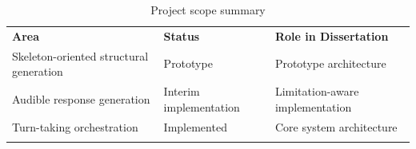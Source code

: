 \begin{longtable}[]{@{}
  >{\raggedright\arraybackslash}p{}
  >{\raggedright\arraybackslash}p{}
  >{\raggedright\arraybackslash}p{}@{}}
\caption{Project scope summary}\label{tab:scope-summary}\\
\toprule\noalign{}
\begin{minipage}[b]{\linewidth}\raggedright
\textbf{Area}
\end{minipage} & \begin{minipage}[b]{\linewidth}\raggedright
\textbf{Status}
\end{minipage} & \begin{minipage}[b]{\linewidth}\raggedright
\textbf{Role in Dissertation}
\end{minipage} \\
\begin{minipage}[b]{\linewidth}\raggedright
Skeleton-oriented structural generation
\end{minipage} & \begin{minipage}[b]{\linewidth}\raggedright
Prototype
\end{minipage} & \begin{minipage}[b]{\linewidth}\raggedright
Prototype architecture
\end{minipage} \\
\begin{minipage}[b]{\linewidth}\raggedright
Audible response generation
\end{minipage} & \begin{minipage}[b]{\linewidth}\raggedright
Interim implementation
\end{minipage} & \begin{minipage}[b]{\linewidth}\raggedright
Limitation-aware implementation
\end{minipage} \\
\begin{minipage}[b]{\linewidth}\raggedright
Turn-taking orchestration
\end{minipage} & \begin{minipage}[b]{\linewidth}\raggedright
Implemented
\end{minipage} & \begin{minipage}[b]{\linewidth}\raggedright
Core system architecture
\end{minipage} \\
\begin{minipage}[b]{\linewidth}\raggedright

\end{minipage}
\end{longtable}
